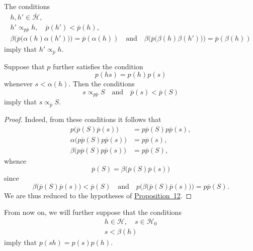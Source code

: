 \documentclass[a4paper,fleqn]{article}
\theoremstyle{plain}
\newenvironment{corollary}[1]
  {\renewcommand\theinnercorollary{#1}\innercorollary}
  {\endinnercorollary}
\theoremstyle{definition}
\newcommand{\oldpage}[1]{{\marginpar{\footnotesize$\bigg\vert$\,\,\,\,\textit{p.~#1}}}}
\newcommand{\textand}{\quad\text{and}\quad}
\newcommand{\HH}{\mathcal{H}}
\newcommand{\bHH}{\overline{\HH}}
\newcommand{\subs}{\mathrel{\propto}}
\begin{document}
\oldpage{374}

\begin{corollary}{1}
  The conditions
  \[
    \begin{gathered}
      h,h'\in\bHH,
    \\h'\subs_{p\overline{p}}h,
      \quad \overline{p}(h') < \overline{p}(h),
    \\\beta\big(
        \overline{p}\big(\alpha(h)\alpha(h')\big)
      \big) = \overline{p}(\alpha(h))
      \textand
      \beta\big(
        \overline{p}\big(\beta(h)\beta(h')\big)
      \big) = \overline{p}(\beta(h))
    \end{gathered}
  \]
  imply that $h'\subs_{\overline{p}}h$.
\end{corollary}

\begin{corollary}{2}
  Suppose that $p$ further satisfies the condition
  \[
    p(hs)
    = p(h)p(s)
  \]
  whenever $s<\alpha(h)$.
  Then the conditions
  \[
    s\subs_{p\overline{p}}S
    \textand
    \overline{p}(s) < \overline{p}(S)
  \]
  imply that $s\subs_{\overline{p}}S$.
\end{corollary}

\begin{proof}
  Indeed, from these conditions it follows that
  \[
    \begin{aligned}
      p\big(
        \overline{p}(S)\overline{p}(s)
      \big)
      &= p\overline{p}(S)p\overline{p}(s),
    \\\alpha\big(
        p\overline{p}(S)p\overline{p}(s)
      \big)
      &= p\overline{p}(s),
    \\\beta\big(
        p\overline{p}(S)p\overline{p}(s)
      \big)
      &= p\overline{p}(S),
    \end{aligned}
  \]
  whence
  \[
    \overline{p}(S)
    = \beta\big(
      \overline{p}(S)\overline{p}(s)
    \big)
  \]
  since
  \[
    \beta\big(
      \overline{p}(S)\overline{p}(s)
    \big) < \overline{p}(S)
    \textand
    p\big(
      \beta\big(
        \overline{p}(S)\overline{p}(s)
      \big)
    \big) = p\overline{p}(S).
  \]
  We are thus reduced to the hypotheses of \hyperref[proposition:i-12]{Proposition~12}.
\end{proof}

From now on, we will further suppose that the conditions
\[
  \begin{gathered}
    h\in\HH,
    \quad s\in\HH_0
  \\s < \beta(h)
  \end{gathered}
\]
imply that $p(sh)=p(s)p(h)$.
\end{document}
